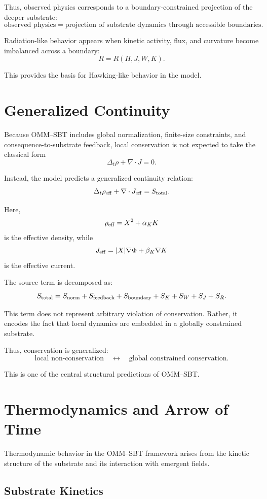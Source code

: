 \documentclass[11pt]{article}
\begin{document}
Thus, observed physics corresponds to a boundary-constrained projection of the deeper substrate:
\[
\text{observed physics}
=
\text{projection of substrate dynamics through accessible boundaries}.
\]

Radiation-like behavior appears when kinetic activity, flux, and curvature become imbalanced across a boundary:
\[
R = R(H,J,W,K).
\]

This provides the basis for Hawking-like behavior in the model.

\section{Generalized Continuity}

Because OMM--SBT includes global normalization, finite-size constraints, and consequence-to-substrate feedback, local conservation is not expected to take the classical form
\[
\Delta_t \rho + \nabla \cdot J = 0.
\]

Instead, the model predicts a generalized continuity relation:
\[
\Delta_t \rho_{\rm eff}
+
\nabla \cdot J_{\rm eff}
=
S_{\rm total}.
\]

Here,
\[
\rho_{\rm eff}=X^2+\alpha_K K
\]
is the effective density, while
\[
J_{\rm eff}=|X|\nabla\Phi+\beta_K\nabla K
\]
is the effective current.

The source term is decomposed as:
\[
S_{\rm total}
=
S_{\rm norm}
+
S_{\rm feedback}
+
S_{\rm boundary}
+
S_K
+
S_W
+
S_J
+
S_R.
\]

This term does not represent arbitrary violation of conservation. Rather, it encodes the fact that local dynamics are embedded in a globally constrained substrate.

Thus, conservation is generalized:
\[
\text{local non-conservation}
\quad \leftrightarrow \quad
\text{global constrained conservation}.
\]

This is one of the central structural predictions of OMM--SBT.

\section{Thermodynamics and Arrow of Time}

Thermodynamic behavior in the OMM--SBT framework arises from the kinetic structure of the substrate and its interaction with emergent fields.

\subsection{Substrate Kinetics}
\end{document}
